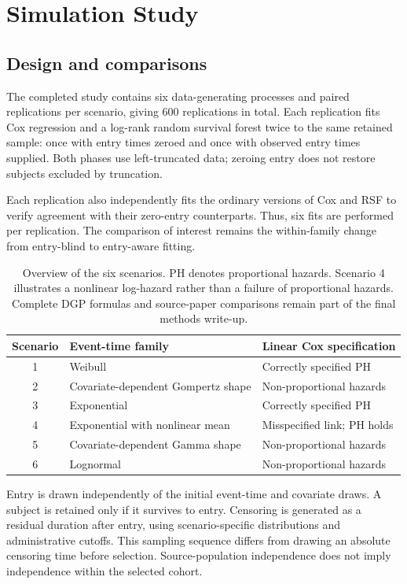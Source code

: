 \chapter{Simulation Study}
\section{Design and comparisons}
The completed study contains six data-generating processes and
\SimReplications{} paired replications per scenario, giving 600 replications
in total. Each replication fits Cox regression and a log-rank random survival
forest twice to the same retained sample: once with entry times zeroed and
once with observed entry times supplied. Both phases use left-truncated
data; zeroing entry does not restore subjects excluded by truncation.

Each replication also independently fits the ordinary versions of Cox and
RSF to verify agreement with their zero-entry counterparts. Thus, six fits
are performed per replication. The comparison of interest remains the
within-family change from entry-blind to entry-aware fitting.

\begin{table}[htbp]
\centering\small
\setlength{\tabcolsep}{4pt}
\begin{tabular}{cll}
\toprule
Scenario & Event-time family & Linear Cox specification\\
\midrule
1 & Weibull & Correctly specified PH\\
2 & Covariate-dependent Gompertz shape & Non-proportional hazards\\
3 & Exponential & Correctly specified PH\\
4 & Exponential with nonlinear mean & Misspecified link; PH holds\\
5 & Covariate-dependent Gamma shape & Non-proportional hazards\\
6 & Lognormal & Non-proportional hazards\\
\bottomrule
\end{tabular}
\caption{Overview of the six scenarios. PH denotes proportional hazards.
Scenario 4 illustrates a nonlinear log-hazard rather than a failure of
proportional hazards. Complete DGP formulas and source-paper comparisons
remain part of the final methods write-up.}
\label{tab:dgp}
\end{table}

Entry is drawn independently of the initial event-time and covariate
draws. A subject is retained only if it survives to entry. Censoring is
generated as a residual duration after entry, using scenario-specific
distributions and administrative cutoffs. This sampling sequence differs
from drawing an absolute censoring time before selection. Source-population
independence does not imply independence within the selected cohort.

